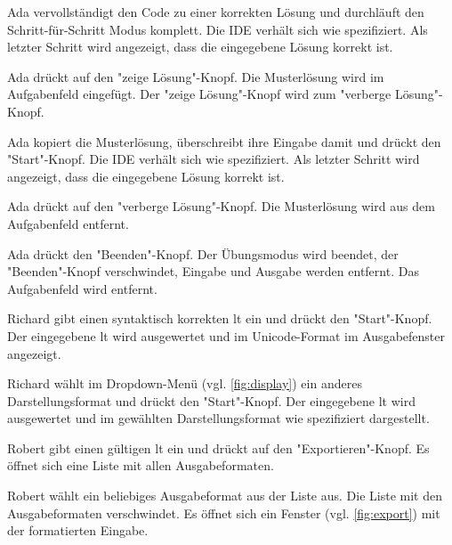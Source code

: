 \documentclass[parskip=full,11pt,twoside]{scrartcl}
\begin{document}
{Ada vervollständigt den Code zu einer korrekten Lösung und durchläuft den Schritt-für-Schritt Modus komplett.}
{Die IDE verhält sich wie spezifiziert.
 Als letzter Schritt wird angezeigt, dass die eingegebene Lösung korrekt ist.}

{Ada drückt auf den "zeige Lösung"-Knopf.}
{Die Musterlösung wird im Aufgabenfeld eingefügt.
 Der "zeige Lösung"-Knopf wird zum "verberge Lösung"-Knopf.}

{Ada kopiert die Musterlösung, überschreibt ihre Eingabe damit und drückt den "Start"-Knopf.}
{Die IDE verhält sich wie spezifiziert. 
 Als letzter Schritt wird angezeigt, dass die eingegebene Lösung korrekt ist.}
 
{Ada drückt auf den "verberge Lösung"-Knopf.}
{Die Musterlösung wird aus dem Aufgabenfeld entfernt.}
 
{Ada drückt den "Beenden"-Knopf.}
{Der Übungsmodus wird beendet, der "Beenden"-Knopf verschwindet, Eingabe und Ausgabe werden entfernt.
 Das Aufgabenfeld wird entfernt.}


{Richard gibt einen syntaktisch korrekten \gls{lt} ein und drückt den "Start"-Knopf.}
{Der eingegebene \gls{lt} wird ausgewertet und im Unicode-Format im Ausgabefenster angezeigt.}

{Richard wählt im Dropdown-Menü (vgl. \cref{fig:display}) ein anderes Darstellungsformat und drückt den "Start"-Knopf.}
{Der eingegebene \gls{lt} wird ausgewertet und im gewählten Darstellungsformat wie spezifiziert dargestellt.}


{Robert gibt einen gültigen \gls{lt} ein und drückt auf den "Exportieren"-Knopf.}
{Es öffnet sich eine Liste mit allen Ausgabeformaten.}

{Robert wählt ein beliebiges Ausgabeformat aus der Liste aus.}
{Die Liste mit den Ausgabeformaten verschwindet.
Es öffnet sich ein Fenster (vgl. \cref{fig:export}) mit der formatierten Eingabe.}
\end{document}

